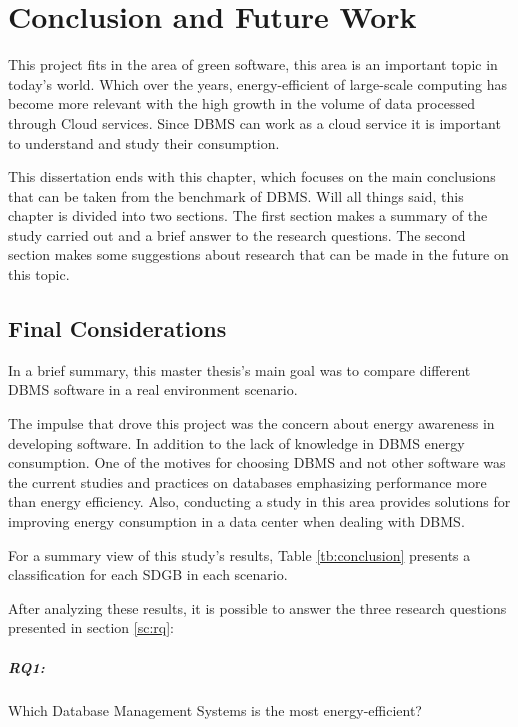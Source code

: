 \chapter{Conclusion and Future Work}
\label{cha:conclusion}

	
	This project fits in the area of green software, this area is an important topic in today's world. Which over the years, energy-efficient of large-scale computing has become more relevant with the high growth in the volume of data processed through Cloud services. Since DBMS can work as a cloud service it is important to understand and study their consumption.
	
	This dissertation ends with this chapter, which focuses on the main conclusions that can be taken from the benchmark of DBMS.	Will all things said, this chapter is divided into two sections. The first section makes a summary of the study carried out and a brief answer to the research questions. The second section makes some suggestions about research that can be made in the future on this topic.
	

\section{Final Considerations}
\label{sc:finalcons}
In a brief summary, this master thesis's main goal was to compare different DBMS software in a real environment scenario.

The impulse that drove this project was the concern about energy awareness in developing software. In addition to the lack of knowledge in DBMS energy consumption. One of the motives for choosing DBMS and not other software was the current studies and practices on databases emphasizing performance more than energy efficiency. Also, conducting a study in this area provides solutions for improving energy consumption in a data center when dealing with DBMS.

For a summary view of this study's results, Table \ref{tb:conclusion}  presents a classification for each SDGB in each scenario.




After analyzing these results, it is possible to answer the three research questions presented in section \ref{sc:rq}: 
    \paragraph{RQ1:} Which Database Management Systems is the most energy-efficient?

